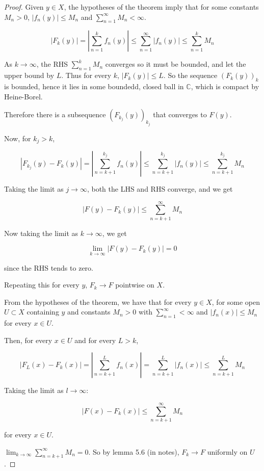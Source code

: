 \documentclass[12pt,a4paper]{article}
\theoremstyle{definition}
\begin{document}
\begin{proof}
	Given $y \in X$, the hypotheses of the theorem imply that for some constants $M_n > 0$, $|f_n(y)| \le M_n$ and $\sum_{n = 1}^{\infty} M_n < \infty$.

	\[|F_k(y)| = |\sum_{n = 1}^k f_n(y)| \le \sum_{n = 1}^{\infty} |f_n(y)| \le \sum_{n = 1}^k M_n\]

	As $k \rightarrow \infty$, the RHS $\sum_{n = 1}^k M_n$ converges so it must be bounded, and let the upper bound by $L$. Thus for every $k$, $|F_k(y)| \le L$. So the sequence ${(F_k(y))}_k$ is bounded, hence it lies in some boundedd, closed ball in $\mathbb{C}$, which is compact by Heine-Borel.

	Therefore there is a subsequence ${(F_{k_j}(y))}_{k_j}$ that converges to $F(y)$.

	Now, for $k_j > k$,

	\[|F_{k_j}(y) - F_k(y)| = |\sum_{n = k + 1}^{k_j} f_n(y)| \le \sum_{n = k + 1}^{k_j} |f_n(y)| \le \sum_{n = k + 1}^{k_j} M_n\]

	Taking the limit as $j \rightarrow \infty$, both the LHS and RHS converge, and we get

	\[|F(y) - F_k(y)| \le \sum_{n = k + 1}^{\infty} M_n\]

	Now taking the limit as $k \rightarrow \infty$, we get

	\[\lim_{k \rightarrow \infty} |F(y) - F_k(y)| = 0\]

	since the RHS tends to zero.

	Repeating this for every $y$, $F_k \rightarrow F$ pointwise on $X$.

	From the hypotheses of the theorem, we have that for every $y \in X$, for some open $U \subset X$ containing $y$ and constants $M_n > 0$ with $\sum_{n = 1}^{\infty} < \infty$ and $|f_n(x)| \le M_n$ for every $x \in U$.

	Then, for every $x \in U$ and for every $L > k$,

	\[|F_L(x) - F_k(x)| = |\sum_{n = k + 1}^L f_n(x)| = \sum_{n = k + 1}^L |f_n(x)| \le \sum_{n = k + 1}^L M_n\]

	Taking the limit as $l \rightarrow \infty$:

	\[|F(x) - F_k(x)| \le \sum_{n = k + 1}^{\infty} M_n\]

	for every $x \in U$.

	$\lim_{k \rightarrow \infty} \sum_{n = k + 1}^{\infty} M_n = 0$. So by lemma 5.6 (in notes), $F_k \rightarrow F$ uniformly on $U$.
\end{proof}
\end{document}
